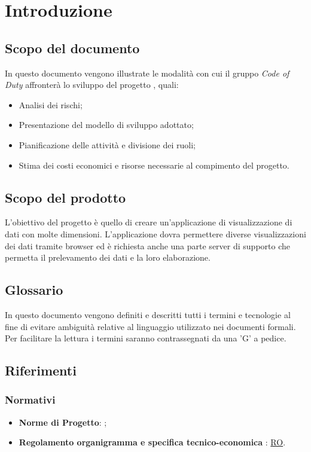\section{Introduzione}
\subsection{Scopo del documento}
	In questo documento vengono illustrate le modalità con cui il gruppo \textit{Code of Duty} affronterà lo sviluppo del progetto \hd, quali:
	\begin{itemize}
    		\item Analisi dei rischi;
    		\item Presentazione del modello di sviluppo adottato;
    		\item Pianificazione delle attività e divisione dei ruoli;
    		\item Stima dei costi economici e risorse necessarie al compimento del progetto.
	\end{itemize}
\subsection{Scopo del prodotto}
	L'obiettivo del progetto è quello di creare un'applicazione di visualizzazione di dati con molte dimensioni. L'applicazione dovra permettere diverse visualizzazioni dei dati tramite browser ed è richiesta anche una parte server di supporto che permetta il prelevamento dei dati e la loro elaborazione.
\subsection{Glossario}
	In questo documento vengono definiti e descritti tutti i termini e tecnologie al fine di evitare ambiguità relative al linguaggio utilizzato nei documenti formali. Per facilitare la lettura i termini saranno contrassegnati da una 'G' a pedice.  
\subsection{Riferimenti}
	\subsubsection{Normativi}
		\begin{itemize}
			\item \textbf{Norme di Progetto}: \NdP ;
			\item \textbf{Regolamento organigramma e specifica tecnico-economica} : \href{https://www.math.unipd.it/~tullio/IS-1/2020/Progetto/RO.html}{RO}.
		\end{itemize}
